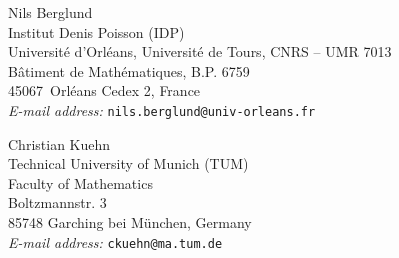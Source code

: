 \documentclass[reqno,11pt]{article}
\begin{document}

{\small

%               
}






\goodbreak

\vfill


\bigskip\bigskip\noindent
{\small 
Nils Berglund \\
Institut Denis Poisson (IDP) \\ 
Universit\'e d'Orl\'eans, Universit\'e de Tours, CNRS -- UMR 7013 \\
B\^atiment de Math\'ematiques, B.P. 6759\\
45067~Orl\'eans Cedex 2, France \\
{\it E-mail address: }{\tt nils.berglund@univ-orleans.fr}
}

\bigskip\noindent
{\small 
Christian Kuehn \\
Technical University of Munich (TUM) \\
Faculty of Mathematics \\
Boltzmannstr. 3 \\
85748 Garching bei M\"unchen, Germany \\
{\it E-mail address: }{\tt ckuehn@ma.tum.de}
}


\end{document}
